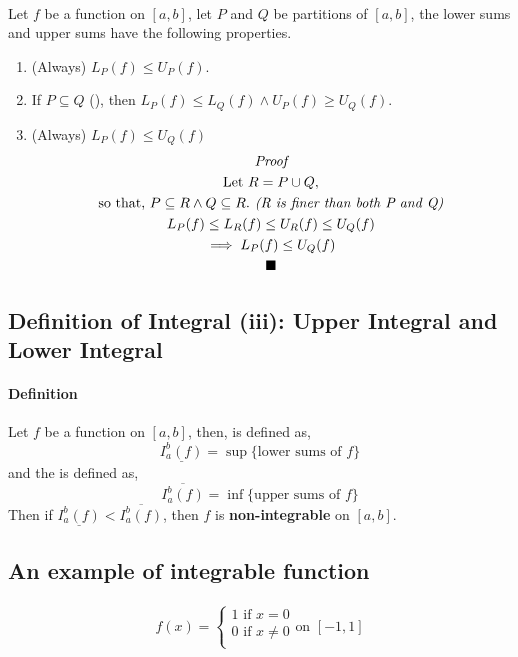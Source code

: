 \documentclass{article}
\begin{document}
	\paragraph{} Let $f$ be a  function on $[a,b]$, let $P$ and $Q$ be partitions of $[a,b]$, the lower sums and upper sums have the following properties.
	\begin{enumerate}
		\item (Always) $L_P (f) \leq U_P (f)$.
		\item If $P \subseteq Q$ (), then $L_P (f) \leq L_Q (f) \land U_P (f) \geq U_Q (f)$.
		\item (Always) $L_P (f) \leq U_Q (f)$
		\begin{multline*}
		\emph{Proof} \\
		\text{Let } R = P \cup Q,\\
		\text{so that, } P \subseteq R \land Q \subseteq R. \emph{ (R is finer than both P and Q)}\\
		L_P (f) \leq L_R (f) \leq U_R (f) \leq U_Q (f) \\
		\implies L_P (f) \leq U_Q (f)\\
		\blacksquare
		\end{multline*}
	\end{enumerate}
	\subsection{Definition of Integral (iii): Upper Integral and Lower Integral}
	\paragraph{Definition} Let $f$ be a  function on $[a,b]$, then,  is defined as,
	\[
	\underline{I_a^b (f)} = \sup\{\text{lower sums of }f\}
	\]
	and the  is defined as, 
	\[
	\overline{I_a^b (f)} = \inf\{\text{upper sums of }f\}
	\] Then if $\underline{I_a^b (f)} < \overline{I_a^b (f)}$, then $f$ is \textbf{non-integrable} on $[a,b]$.
	\subsection{An example of integrable function}
	\paragraph{}
	\[
	f(x) = \begin{cases}
		1 \text{ if } x = 0 \\
		0 \text{ if } x \neq 0 \\
	\end{cases} \text{on } [-1, 1]
	\]
\end{document}
